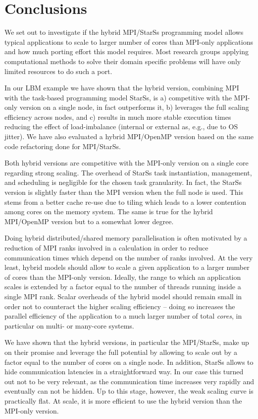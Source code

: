 \documentclass[conference]{IEEEtran}
\newcommand{\starss}{{StarSs}}
\begin{document}
\section{Conclusions}

We set out to investigate if the hybrid MPI/\starss{} programming
model allows typical applications to scale to larger number of
cores than MPI-only applications and how much porting effort this
model requires.
Most research groups applying computational methods to
solve their domain specific problems will have only limited resources
to do such a port.

In our LBM example we have shown that the hybrid version,
combining MPI with the task-based programming model \starss{}, is a)
competitive with the MPI-only version on a single node, in fact
outperforms it, b) leverages the full scaling efficiency
across nodes, and c) results in much more stable execution times
reducing the effect of load-imbalance (internal or external as,
e.g., due to OS jitter). 
We have also evaluated a hybrid MPI/OpenMP version based on the same
code refactoring done for MPI/\starss{}.

Both hybrid versions are competitive with the MPI-only version on a
single core regarding strong scaling. The overhead of \starss{} task
instantiation, management, and scheduling is negligible for
the chosen task granularity. In fact, the \starss{} version is
slightly faster than the MPI version when the full node is used. This
stems from a better cache re-use due to tiling which leads to 
a lower contention among cores on the memory system. The same is
true for the hybrid MPI/OpenMP version but to a somewhat lower degree.

Doing hybrid distributed/shared memory parallelisation is often
motivated by a reduction of MPI ranks involved in a calculation in
order to reduce communication times which depend on the number of
ranks involved. At the very least, hybrid models should allow to scale
a given application to a larger number of cores than the MPI-only
version. Ideally, the range to which an application scales is extended
by a factor equal to the number of threads running inside a single MPI
rank.  Scalar overheads of the hybrid model should
remain small in order not to counteract the higher scaling efficiency
-- doing so increases the parallel efficiency of the application
to a much larger number of total {\em cores}, in particular on
multi- or many-core systems.

We have shown that the hybrid versions, in particular the
MPI/\starss{}, make up on their promise and leverage the full potential
by allowing to scale out by a factor equal to the number of cores on a
single node. In addition, \starss{} allows to hide communication
latencies in a straightforward way. In our case this turned out not to be very
relevant, as the communication time increases very rapidly and
eventually can not be hidden. Up to this stage, however, the weak
scaling curve is practically flat.  At scale, it is more efficient to
use the hybrid version than the MPI-only version.
 
\end{document}
